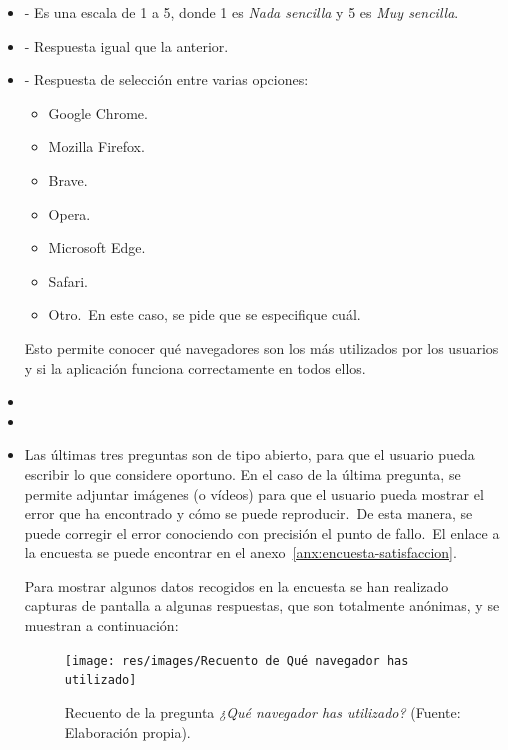 \begin{itemize}
	\item {} - Es una escala de 1 a 5, donde 1 es
	\textit{Nada sencilla} y 5 es \textit{Muy sencilla}.
	\item {} - Respuesta igual que la anterior.
	\item {} - Respuesta de selección entre varias opciones:
	\begin{itemize}
		\item Google Chrome.
		\item Mozilla Firefox.
		\item Brave.
		\item Opera.
		\item Microsoft Edge.
		\item Safari.
		\item Otro.\ En este caso, se pide que se especifique cuál.
	\end{itemize}
	Esto permite conocer qué navegadores son los más utilizados por los usuarios y si la aplicación funciona
	correctamente en todos ellos.
	\item {}
	\item {}
	\item {}

	Las últimas tres preguntas son de tipo abierto, para que el usuario pueda escribir lo que considere oportuno.
	En el caso de la última pregunta, se permite adjuntar imágenes (o vídeos) para que el usuario pueda mostrar
	el error que ha encontrado y cómo se puede reproducir.\ De esta manera, se puede corregir el error conociendo
	con precisión el punto de fallo.\ El enlace a la encuesta se puede encontrar en el
	anexo~\ref{anx:encuesta-satisfaccion}.

	Para mostrar algunos datos recogidos en la encuesta se han realizado capturas de pantalla a algunas respuestas,
	que son totalmente anónimas, y se muestran a continuación:

	\begin{figure}[h]
		\centering
		\texttt{[image: res/images/Recuento de Qué navegador has utilizado]}
		\caption{Recuento de la pregunta \textit{¿Qué navegador has utilizado?} (Fuente: Elaboración propia).}
		\label{fig:recuento-navegador}
	\end{figure}


\end{itemize}

